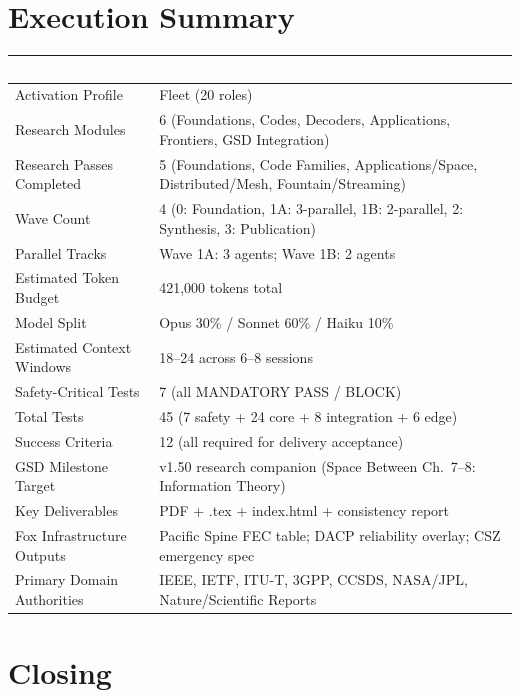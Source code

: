 \documentclass[11pt,letterpaper]{article}
\newcommand{\tableheader}[1]{\textbf{\sffamily\textcolor{white}{#1}}}
\begin{document}
\section{Execution Summary}

\begin{center}
\begin{tabularx}{\textwidth}{L{4cm}X}
\toprule
{}
\tableheader{Metric} & \tableheader{Value} \\
\midrule
Activation Profile & Fleet (20 roles) \\
Research Modules & 6 (Foundations, Codes, Decoders, Applications, Frontiers, GSD Integration) \\
Research Passes Completed & 5 (Foundations, Code Families, Applications/Space, Distributed/Mesh, Fountain/Streaming) \\
Wave Count & 4 (0: Foundation, 1A: 3-parallel, 1B: 2-parallel, 2: Synthesis, 3: Publication) \\
Parallel Tracks & Wave 1A: 3 agents; Wave 1B: 2 agents \\
Estimated Token Budget & 421,000 tokens total \\
Model Split & Opus 30\% / Sonnet 60\% / Haiku 10\% \\
Estimated Context Windows & 18--24 across 6--8 sessions \\
Safety-Critical Tests & 7 (all MANDATORY PASS / BLOCK) \\
Total Tests & 45 (7 safety + 24 core + 8 integration + 6 edge) \\
Success Criteria & 12 (all required for delivery acceptance) \\
GSD Milestone Target & v1.50 research companion (Space Between Ch.\ 7--8: Information Theory) \\
Key Deliverables & PDF + .tex + index.html + consistency report \\
Fox Infrastructure Outputs & Pacific Spine FEC table; DACP reliability overlay; CSZ emergency spec \\
Primary Domain Authorities & IEEE, IETF, ITU-T, 3GPP, CCSDS, NASA/JPL, Nature/Scientific Reports \\
\bottomrule
\end{tabularx}
\end{center}

\section{Closing}
\end{document}
